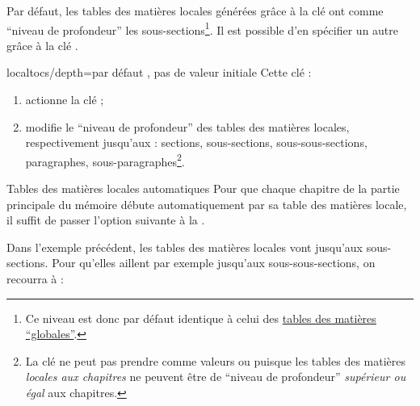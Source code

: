 Par défaut, les tables des matières locales générées grâce à la clé
 ont comme \enquote{niveau de profondeur} les
sous-sections\footnote{Ce niveau est donc par défaut identique à celui des
  \hyperref[sec-table-des-matieres]{tables des matières
    \enquote{globales}}.}. Il est possible d'en spécifier un autre grâce à la
clé .

{%
  \begin{docKey}[][doc
    new=2016-10-16]{localtocs/depth}{=\textbar{}\textbar{}\textbar{}\textbar{}}{par
      défaut , pas de valeur initiale}
    Cette clé :
    \begin{enumerate}
    \item actionne la clé  ;
    \item modifie le \enquote{niveau de profondeur} des tables des matières
      locales, respectivement jusqu'aux : sections, sous-sections,
      sous-sous-sections, paragraphes, sous-paragraphes\footnote{La clé
         ne peut pas prendre comme valeurs
         ou  puisque les tables des matières
        \emph{locales aux chapitres} ne peuvent être de \enquote{niveau de
          profondeur} \emph{supérieur ou égal} aux chapitres.}.
    \end{enumerate}

\end{docKey}
}

\begin{dbexample}{Tables des matières locales automatiques}{}
  Pour que chaque chapitre de la partie principale du mémoire débute
  automatiquement par sa table des matières locale, il suffit de passer l'option
  suivante à la \yatCl{}.
  
  Dans l'exemple précédent, les tables des matières locales vont jusqu'aux
  sous-sections. Pour qu'elles aillent par exemple jusqu'aux sous-sous-sections,
  on recourra à :
\end{dbexample}

